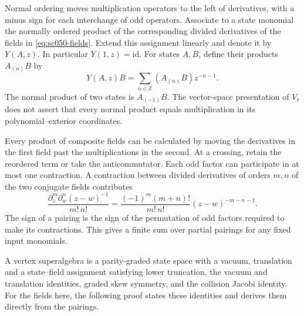 Normal ordering moves multiplication operators to the left of
derivatives, with a minus sign for each interchange of odd operators.
Associate to a state monomial the normally ordered product of the
corresponding divided derivatives of the fields in
\eqref{eq:sc050-fields}. Extend this assignment linearly and denote it
by \(Y(A,z)\). In particular \(Y(1,z)=\mathrm{id}\).
For states \(A,B\), define their products \(A_{(n)}B\) by
\[
 Y(A,z)B=\sum_{n\in\mathbb Z}(A_{(n)}B)z^{-n-1}.
\]
The normal product of two states is \(A_{(-1)}B\).
The vector-space presentation of \(V_r\) does not assert that every
normal product equals multiplication in its polynomial--exterior
coordinates.

Every product of composite fields can be calculated by moving the
derivatives in the first field past the multiplications in the
second. At a crossing, retain the reordered term or take the
anticommutator. Each odd factor can participate in at most one
contraction. A contraction between divided derivatives of orders
\(m,n\) of the two conjugate fields contributes
\begin{equation}\label{eq:sc050-contraction}
 \frac{\partial_z^m\partial_w^n(z-w)^{-1}}{m!\,n!}
 =\frac{(-1)^m(m+n)!}{m!\,n!}(z-w)^{-m-n-1}.
\end{equation}
The sign of a pairing is the sign of the permutation of odd factors
required to make its contractions. This gives a finite sum over
partial pairings for any fixed input monomials.

A vertex superalgebra is a parity-graded state space with a vacuum,
translation and a state--field assignment satisfying lower
truncation, the vacuum and translation identities, graded skew
symmetry, and the collision Jacobi identity. For the fields here,
the following proof states these identities and derives them
directly from the pairings.

